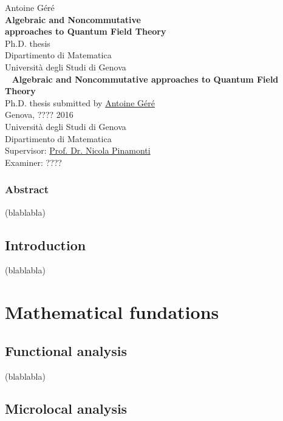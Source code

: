 \documentclass[11pt]{book}
\makeatletter
\newcommand*{\makepagetitle}{%
%
\thispagestyle{empty}
%
\raggedright%
%
\vspace*{44pt}%
%
{\LARGE Antoine Géré}\\[\baselineskip]%
%
\vspace*{100pt}%
%
{\Huge\bfseries Algebraic and Noncommutative \\[8pt] approaches to Quantum Field Theory}\\[\baselineskip]%
%
\vspace*{22pt}%
%
{\LARGE Ph.D. thesis}\\[\baselineskip]%
%
\vspace*{44pt}%
%
{\LARGE Dipartimento di Matematica}\\[\baselineskip]%
%
{\LARGE Università degli Studi di Genova}\\[\baselineskip]%
%
\vfill%
%
\newpage%
%
\thispagestyle{empty}%
%
\ \vfill%
%
\textbf{Algebraic and Noncommutative approaches to Quantum Field Theory} \\
Ph.D. thesis submitted by \href{mailto:gere@dima.unige.it}{Antoine Géré} \\
Genova, ???? 2016 \\[8pt]
%
Università degli Studi di Genova \\
Dipartimento di Matematica \\[8pt]
%
Supervisor: \href{mailto:pinamont@dima.unige.it}{Prof. Dr. Nicola Pinamonti} \\
Examiner: ????
%
}%
\makeatother
\begin{document}


\makepagetitle

\newpage


\vspace*{100pt}

\thispagestyle{empty}
\section*{\centering Abstract}

(blablabla)


\tableofcontents


\chapter*{Introduction} \label{chp:intro}


(blablabla)

\part{Mathematical fundations} \label{chp:math}

\chapter{Functional analysis}

(blablabla)

\chapter{Microlocal analysis}
\end{document}
